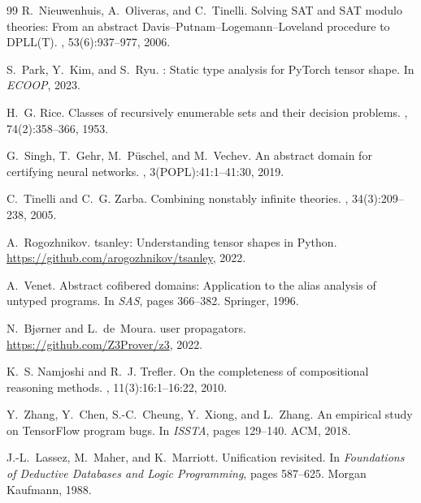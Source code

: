\documentclass[11pt]{article}
\begin{document}
\begin{thebibliography}{99}
R.~Nieuwenhuis, A.~Oliveras, and C.~Tinelli.
\newblock Solving {SAT} and {SAT} modulo theories: From an abstract
  {Davis--Putnam--Logemann--Loveland} procedure to {DPLL(T)}.
, 53(6):937--977, 2006.

S.~Park, Y.~Kim, and S.~Ryu.
: Static type analysis for {PyTorch} tensor shape.
\newblock In {\em ECOOP}, 2023.

H.~G. Rice.
\newblock Classes of recursively enumerable sets and their decision problems.
, 74(2):358--366, 1953.

G.~Singh, T.~Gehr, M.~P\"uschel, and M.~Vechev.
\newblock An abstract domain for certifying neural networks.
, 3(POPL):41:1--41:30, 2019.


C.~Tinelli and C.~G. Zarba.
\newblock Combining nonstably infinite theories.
, 34(3):209--238, 2005.

A.~Rogozhnikov.
\newblock tsanley: Understanding tensor shapes in {Python}.
\newblock \url{https://github.com/arogozhnikov/tsanley}, 2022.

A.~Venet.
\newblock Abstract cofibered domains: Application to the alias analysis of
  untyped programs.
\newblock In {\em SAS}, pages 366--382. Springer, 1996.

N.~Bj{\o}rner and L.~de~Moura.
 user propagators.
\newblock \url{https://github.com/Z3Prover/z3}, 2022.

K.~S. Namjoshi and R.~J. Trefler.
\newblock On the completeness of compositional reasoning methods.
, 11(3):16:1--16:22, 2010.

Y.~Zhang, Y.~Chen, S.-C.~Cheung, Y.~Xiong, and L.~Zhang.
\newblock An empirical study on {TensorFlow} program bugs.
\newblock In {\em ISSTA}, pages 129--140. ACM, 2018.

J.-L.~Lassez, M.~Maher, and K.~Marriott.
\newblock Unification revisited.
\newblock In {\em Foundations of Deductive Databases and Logic Programming},
  pages 587--625. Morgan Kaufmann, 1988.

\end{thebibliography}
\end{document}
